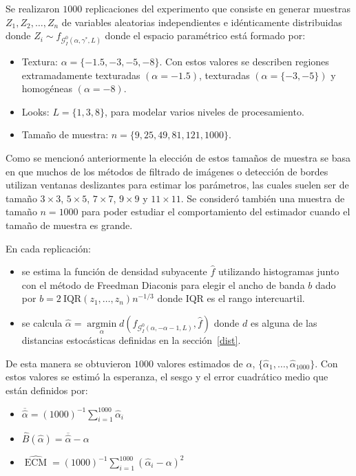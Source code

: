 Se realizaron $1000$ replicaciones del experimento que consiste en generar muestras $Z_1, Z_2,\ldots,Z_n$ de variables aleatorias independientes e idénticamente distribuidas donde $Z_i \sim f_{\mathcal{G}_I^0(\alpha,\gamma^*,L)}$ donde el espacio paramétrico está formado por:

\begin{itemize}
	\item Textura: $\alpha=\{-1.5, -3, -5, -8\}$. Con estos valores se describen regiones extramadamente texturadas $(\alpha=-1.5)$, texturadas $(\alpha=\{-3,-5\})$ y homogéneas $(\alpha=-8)$. 
	\item Looks: $L=\{1,3,8\}$, para modelar varios niveles de procesamiento.
	\item Tamaño de muestra: $n=\{9, 25,49, 81,121,1000\}$. 
\end{itemize}

Como se mencionó anteriormente la elección de estos tamaños de muestra se basa en que muchos de los métodos de filtrado de imágenes o detección de bordes utilizan ventanas deslizantes para estimar los parámetros, las cuales suelen ser de tamaño $3 \times 3$,  $5 \times 5$, $7 \times 7$, $9 \times 9$ y  $11 \times 11$. Se consideró también una muestra de tamaño $n=1000$ para poder estudiar el comportamiento del estimador cuando el tamaño de muestra es grande. 

En cada replicación:
\begin{itemize}
	\item se estima la función de densidad subyacente $\widehat{f}$ utilizando histogramas junto con el método de Freedman Diaconis para elegir el ancho de banda $b$ dado por $b=2 \ \text{IQR}(z_1,\ldots,z_n) n^{-1/3}$ donde $\text{IQR}$ es el rango intercuartil.
	\item se calcula $\widehat{\alpha}= \mathop{\text{argmin}}\limits_{\alpha}d(f_{\mathcal{G}_I^0(\alpha,-\alpha-1,L)},\widehat{f})$ donde $d$ es alguna de las distancias estocásticas definidas en la sección~\ref{dist}.
\end{itemize} 

De esta manera se obtuvieron $1000$ valores estimados de $\alpha$, $\{\widehat{\alpha}_1, \dots, \widehat{\alpha}_{1000}\}$. Con estos valores se estimó la esperanza, el sesgo y el error cuadrático medio que están definidos por:

\begin{itemize}
	\item $\overline{\widehat{\alpha}}=(1000)^{-1}{\sum_{i=1}^{1000}{\widehat{\alpha}_i}}$
	\item $\widehat{B}(\widehat\alpha) = \overline{\widehat\alpha}- \alpha$
	\item $\widehat{\operatorname{\text{ECM}}}=({1000})^{-1}{\sum_{i=1}^{1000}{(\widehat{\alpha}_i-\alpha)^2}}$
\end{itemize}


